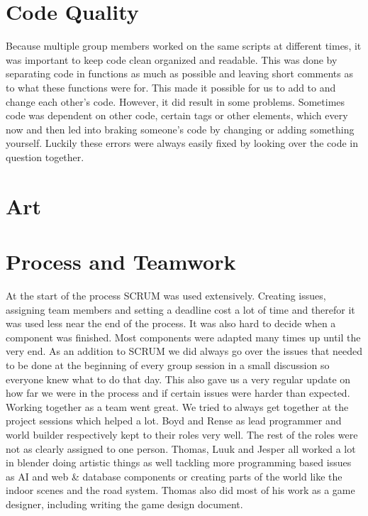 \documentclass{article}
\begin{document}
\newpage
\section{Code Quality}
Because multiple group members worked on the same scripts at different times, it was important to keep code clean organized and readable. This was done by separating code in functions as much as possible and leaving short comments as to what these functions were for. This made it possible for us to add to and change each other’s code. However, it did result in some problems. Sometimes code was dependent on other code, certain tags or other elements, which every now and then led into braking someone’s code by changing or adding something yourself. Luckily these errors were always easily fixed by looking over the code in question together.

\section{Art}

\section{Process and Teamwork}
At the start of the process SCRUM was used extensively. Creating issues, assigning team members and setting a deadline cost a lot of time and therefor it was used less near the end of the process. It was also hard to decide when a component was finished. Most components were adapted many times up until the very end. As an addition to SCRUM we did always go over the issues that needed to be done at the beginning of every group session in a small discussion so everyone knew what to do that day. This also gave us a very regular update on how far we were in the process and if certain issues were harder than expected.\\

Working together as a team went great. We tried to always get together at the project sessions which helped a lot. Boyd and Rense as lead programmer and world builder respectively kept to their roles very well. The rest of the roles were not as clearly assigned to one person. Thomas, Luuk and Jesper all worked a lot in blender doing artistic things as well tackling more programming based issues as AI and web \& database components or creating parts of the world like the indoor scenes and the road system. Thomas also did most of his work as a game designer, including writing the game design document.\\
\end{document}
